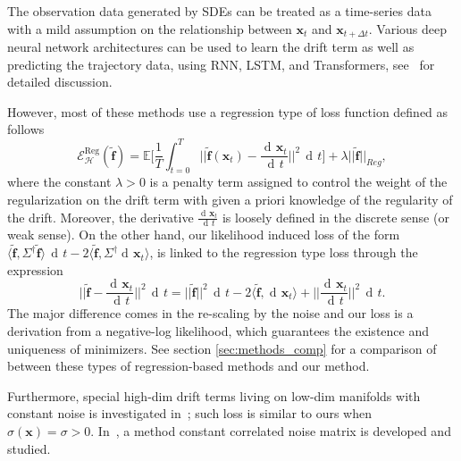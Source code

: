 \documentclass[11pt]{article} %
\def\rvx{{\mathbf{x}}}
\def\vf{{\bm{f}}}
\def\gH{{\mathcal{H}}}
\newcommand{\E}{\mathbb{E}}
\DeclareMathOperator{\dif}{d \!}        %
\newcommand{\dt}{\dif t}
\newcommand{\norm}[1]{||#1||}
\newcommand{\loss}{\mathcal{E}}
\begin{document}
The observation data generated by SDEs can be treated as a time-series data with a mild assumption on the relationship between $\rvx_t$ and $\rvx_{t + \Delta t}$.  Various deep neural network architectures can be used to learn the drift term as well as predicting the trajectory data, using RNN, LSTM, and Transformers, see~\citep{liao2019learning, YANG2023279, wen2022transformers} for detailed discussion.

However, most of these methods use a regression type of loss function defined as follows
\[
\loss_{\gH}^{\text{Reg}}(\tilde\vf) = \E\Big[\frac{1}{T}\int_{t = 0}^T\norm{\tilde\vf(\rvx_t) - \frac{\dif\rvx_t}{\dt}}^2\, \dt\Big] + \lambda||\tilde\vf||_{Reg},
\]
where the constant $\lambda > 0$ is a penalty term assigned to control the weight of the regularization on the drift term with given a priori knowledge of the regularity of the drift.  Moreover, the derivative $\frac{\dif\rvx_t}{\dt}$ is loosely defined in the discrete sense (or weak sense). On the other hand, our likelihood induced loss of the form $\langle\tilde\vf, \Sigma^\dagger\tilde\vf\rangle\,\dt - 2\langle\tilde\vf, \Sigma^\dagger\dif\rvx_t\rangle$, is linked to the regression type loss through the expression 
\[
\norm{\tilde\vf - \frac{\dif\rvx_t}{\dt}}^2\, \dt = \norm{\tilde\vf}^2\, \dt - 2\langle\tilde\vf, \dif\rvx_t\rangle + \norm{\frac{\dif\rvx_t}{\dt}}^2\, \dt.
\]
The major difference comes in the re-scaling by the noise and our loss is a derivation from a negative-log likelihood, which guarantees the existence and uniqueness of minimizers.  See section \ref{sec:methods_comp} for a comparison of between these types of regression-based methods and our method.

Furthermore, special high-dim drift terms living on low-dim manifolds with constant noise is investigated in~\citep{lu2022}; such loss is similar to ours when $\sigma(\rvx) = \sigma > 0$.  In~\citep{guo2024learning}, a method constant correlated noise matrix is developed and studied.
%
\end{document}
